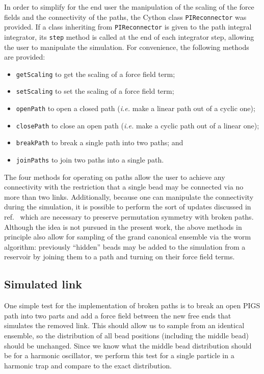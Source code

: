 In order to simplify for the end user the manipulation of the scaling of the force fields and the connectivity of the paths, the Cython class \texttt{PIReconnector} was provided.
If a class inheriting from \texttt{PIReconnector} is given to the path integral integrator, its \texttt{step} method is called at the end of each integrator step, allowing the user to manipulate the simulation.
For convenience, the following methods are provided:
\begin{itemize}
	\item \texttt{getScaling} to get the scaling of a force field term;
	\item \texttt{setScaling} to set the scaling of a force field term;
	\item \texttt{openPath} to open a closed path (\textit{i.e.} make a linear path out of a cyclic one);
	\item \texttt{closePath} to close an open path (\textit{i.e.} make a cyclic path out of a linear one);
	\item \texttt{breakPath} to break a single path into two paths; and
	\item \texttt{joinPaths} to join two paths into a single path.
\end{itemize}
The four methods for operating on paths allow the user to achieve any connectivity with the restriction that a single bead may be connected via no more than two links.
Additionally, because one can manipulate the connectivity during the simulation, it is possible to perform the sort of updates discussed in ref.~\cite{herdman2014path} which are necessary to preserve permutation symmetry with broken paths.
Although the idea is not pursued in the present work, the above methods in principle also allow for sampling of the grand canonical ensemble via the worm algorithm: previously ``hidden'' beads may be added to the simulation from a reservoir by joining them to a path and turning on their force field terms.


\subsection{Simulated link}

\label{subsec:simulated-link}

One simple test for the implementation of broken paths is to break an open PIGS path into two parts and add a force field between the new free ends that simulates the removed link.
This should allow us to sample from an identical ensemble, so the distribution of all bead positions (including the middle bead) should be unchanged.
Since we know what the middle bead distribution should be for a harmonic oscillator, we perform this test for a single particle in a harmonic trap and compare to the exact distribution.

